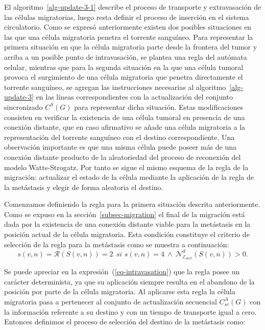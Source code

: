 El algoritmo~\ref{alg-update-3-1} describe el proceso de transporte y extravasaci\'on de las c\'elulas migratorias, luego resta definir el proceso de inserci\'on en el sistema circulatorio. Como se expres\'o anteriormente existen dos posibles situaciones en las que una c\'elula migratoria penetra el torrente sangu\'ineo. Para representar la primera situaci\'on en que la c\'elula migratoria parte desde la frontera del tumor y arriba a un posible punto de intravasaci\'on, se plantea una regla del aut\'omata celular, mientras que para la segunda situaci\'on en la que una c\'elula tumoral provoca el surgimiento de una c\'elula migratoria que penetra directamente el torrente sangu\'ineo, se agregan las instrucciones necesarias al algoritmo~\ref{alg-update-3} en las l\'ineas correspondientes con la actualizaci\'on del conjunto sincronizado $C^S(G)$ para representar dicha situaci\'on. Estas modificaciones consisten en verificar la existencia de una c\'elula tumoral en presencia de una conexi\'on distante, que en caso afirmativo se a\~nade una c\'elula migratoria a la representaci\'on del torrente sangu\'ineo con el destino correspondiente. Una observaci\'on importante es que una misma c\'elula puede poseer m\'as de una conexi\'on distante producto de la aleatoriedad del proceso de reconexi\'on del modelo Watts-Strogatz. Por tanto se sigue el mismo esquema de la regla de la migraci\'on: actualizar el estado de la c\'elula mediante la aplicaci\'on de la regla de la met\'astasis y elegir de forma aleatoria el destino. 

Comenzamos definiendo la regla para la primera situaci\'on descrita anteriormente. Como se expuso en la secci\'on~\ref{subsec-migration} el final de la migraci\'on est\'a dada por la existencia de una conexi\'on distante viable para la met\'astasis en la posici\'on actual de la c\'elula migratoria. Esta condici\'on constituye el criterio de selecci\'on de la regla para la met\'astasis como se muestra a continuaci\'on:
\begin{equation}
s(v,n)=\mathcal{R}(S(v,n))= 2~~\textit{si } s(v,n)=4~\wedge~\mathcal{N}_{\mathcal{E}_{met}}^d(S(v,n))>0. \label{eq-intravasation}
\end{equation}

Se puede apreciar en la expresi\'on~(\ref{eq-intravasation}) que la regla posee un car\'acter determinista, ya que su aplicaci\'on siempre resulta en el abandono de la posici\'on por parte de la c\'elula migratoria. Al aplicarse esta regla la c\'elula migratoria pasa a pertenecer al conjunto de actualizaci\'on secuencial $C_{sc}^A(G)$ con la informaci\'on referente a su destino y con un tiempo de transporte igual a cero. Entonces definimos el proceso de selecci\'on del destino de la met\'astasis como:

